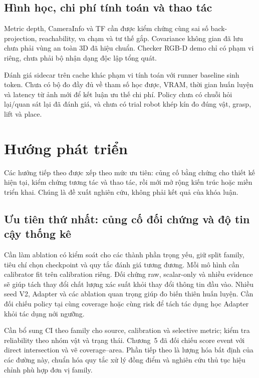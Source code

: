 \subsection{Hình học, chi phí tính toán và thao tác}

Metric depth, CameraInfo và TF cần được kiểm chứng cùng sai số
back-projection, reachability, va chạm và tư thế gắp. Covariance
không gian đã lưu chưa phải vùng an toàn 3D đã hiệu chuẩn.
Checker RGB-D demo chỉ có phạm vi riêng, chưa phải bộ nhận dạng
độc lập tổng quát.

Đánh giá sidecar trên cache khác phạm vi tính toán với runner
baseline sinh token. Chưa có bộ đo đầy đủ về tham số học được,
VRAM, thời gian huấn luyện và latency từ ảnh mới để kết luận ưu
thế chi phí. Policy chưa có chuỗi hỏi lại/quan sát lại đã đánh giá,
và chưa có trial robot khép kín đo đúng vật, grasp, lift và place.

\section{Hướng phát triển}
\label{sec:conclusion-future}

Các hướng tiếp theo được xếp theo mức ưu tiên: củng cố bằng chứng
cho thiết kế hiện tại, kiểm chứng tương tác và thao tác, rồi mới
mở rộng kiến trúc hoặc miền triển khai. Chúng là đề xuất nghiên cứu,
không phải kết quả của khóa luận.

\subsection{Ưu tiên thứ nhất: củng cố đối chứng và độ tin cậy thống kê}

Cần làm ablation có kiểm soát cho các thành phần trọng yếu, giữ
split family, tiêu chí chọn checkpoint và quy tắc đánh giá tương
đương. Mỗi mô hình cần calibrator fit trên calibration riêng.
Đối chứng raw, scalar-only và nhiều evidence sẽ giúp tách thay đổi
chất lượng xác suất khỏi thay đổi thông tin đầu vào. Nhiều seed V2, Adapter và các ablation quan trọng giúp đo biến thiên huấn luyện. Cần đối chiếu policy tại cùng coverage hoặc cùng risk để tách tác dụng học Adapter khỏi tác dụng nới ngưỡng.

Cần bổ sung CI theo family cho source, calibration và selective
metric; kiểm tra reliability theo nhóm vật và trạng thái. Chương~5
đã đối chiếu score event với direct intersection và vẽ coverage--area.
Phần tiếp theo là lượng hóa bất định của các đường này, chuẩn hóa
quy tắc xử lý đồng điểm và nghiên cứu thủ tục hiệu chỉnh phù hợp
đơn vị family.

